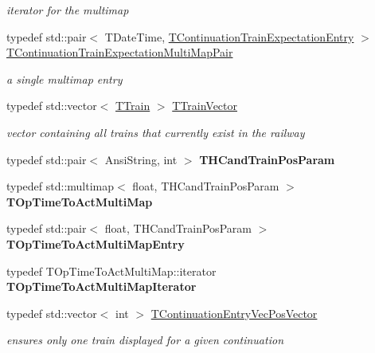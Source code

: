 \begin{DoxyCompactItemize}
\begin{DoxyCompactList}\small\item\em iterator for the multimap \end{DoxyCompactList}\item 
\mbox{\label{class_t_train_controller_a5adc75543948ea32915ef025ace798b2}} 
typedef std\+::pair$<$ T\+Date\+Time, \mbox{\hyperlink{class_t_train_controller_1_1_t_continuation_train_expectation_entry}{T\+Continuation\+Train\+Expectation\+Entry}} $>$ \mbox{\hyperlink{class_t_train_controller_a5adc75543948ea32915ef025ace798b2}{T\+Continuation\+Train\+Expectation\+Multi\+Map\+Pair}}
\begin{DoxyCompactList}\small\item\em a single multimap entry \end{DoxyCompactList}\item 
typedef std\+::vector$<$ \mbox{\hyperlink{class_t_train}{T\+Train}} $>$ \mbox{\hyperlink{class_t_train_controller_aa9073b97736a2733dbdaf8dc52e34c24}{T\+Train\+Vector}}
\begin{DoxyCompactList}\small\item\em vector containing all trains that currently exist in the railway \end{DoxyCompactList}\item 
\mbox{\label{class_t_train_controller_ae5925c2229e1bfe261d5bdb0682b369a}} 
typedef std\+::pair$<$ Ansi\+String, int $>$ {\bfseries T\+H\+Cand\+Train\+Pos\+Param}
\item 
\mbox{\label{class_t_train_controller_afe487c2f349b0cd2c8c46c2f9ec2d2cb}} 
typedef std\+::multimap$<$ float, T\+H\+Cand\+Train\+Pos\+Param $>$ {\bfseries T\+Op\+Time\+To\+Act\+Multi\+Map}
\item 
\mbox{\label{class_t_train_controller_abce329d7da237bd1cf5a094703a8d35b}} 
typedef std\+::pair$<$ float, T\+H\+Cand\+Train\+Pos\+Param $>$ {\bfseries T\+Op\+Time\+To\+Act\+Multi\+Map\+Entry}
\item 
\mbox{\label{class_t_train_controller_ada41a0ac7bb3a3d27c9095dde80d9b59}} 
typedef T\+Op\+Time\+To\+Act\+Multi\+Map\+::iterator {\bfseries T\+Op\+Time\+To\+Act\+Multi\+Map\+Iterator}
\item 
\mbox{\label{class_t_train_controller_a1af939f4f452d7f2002df3dac7efb743}} 
typedef std\+::vector$<$ int $>$ \mbox{\hyperlink{class_t_train_controller_a1af939f4f452d7f2002df3dac7efb743}{T\+Continuation\+Entry\+Vec\+Pos\+Vector}}
\begin{DoxyCompactList}\small\item\em ensures only one train displayed for a given continuation \end{DoxyCompactList}\end{DoxyCompactItemize}
